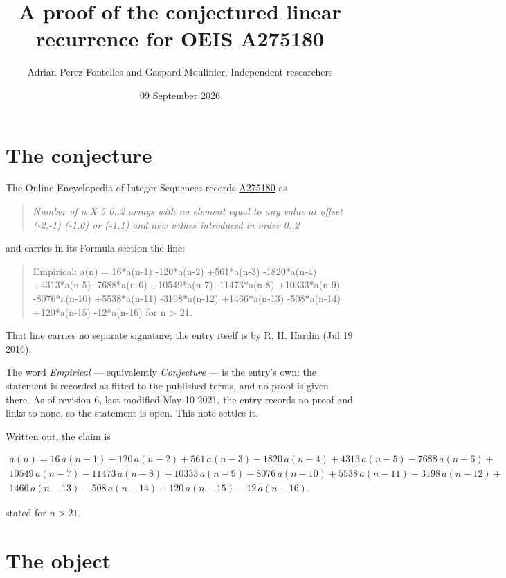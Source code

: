 \documentclass[11pt]{article}
\title{A proof of the conjectured linear recurrence for OEIS A275180}
\author{Adrian Perez Fontelles and Gaspard Moulinier, Independent researchers}
\date{09 September 2026}
\theoremstyle{definition}
\begin{document}
\maketitle
\section{The conjecture}

The Online Encyclopedia of Integer Sequences records \href{https://oeis.org/A275180}{A275180} as

\begin{quote}\itshape Number of n X 5 0..2 arrays with no element equal to any value at offset (-2,-1) (-1,0) or (-1,1) and new values introduced in order 0..2\end{quote}

and carries in its Formula section the line:

\begin{quote}\ttfamily Empirical: a(n) = 16*a(n-1) -120*a(n-2) +561*a(n-3) -1820*a(n-4) +4313*a(n-5) -7688*a(n-6) +10549*a(n-7) -11473*a(n-8) +10333*a(n-9) -8076*a(n-10) +5538*a(n-11) -3198*a(n-12) +1466*a(n-13) -508*a(n-14) +120*a(n-15) -12*a(n-16) for n > 21.\end{quote}

That line carries no separate signature; the entry itself is by R. H. Hardin (Jul 19 2016).

The word {\itshape Empirical} --- equivalently {\itshape Conjecture} --- is the entry's own: the statement is recorded as fitted to the published terms, and no proof is given there. As of revision 6, last modified May 10 2021, the entry records no proof and links to none, so the statement is open. This note settles it.

Written out, the claim is

\begin{multline*} a(n) = 16\,a(n-1) - 120\,a(n-2) + 561\,a(n-3) - 1820\,a(n-4) + 4313\,a(n-5) - 7688\,a(n-6) + \\ 10549\,a(n-7) - 11473\,a(n-8) + 10333\,a(n-9) - 8076\,a(n-10) + 5538\,a(n-11) - 3198\,a(n-12) + \\ 1466\,a(n-13) - 508\,a(n-14) + 120\,a(n-15) - 12\,a(n-16). \end{multline*}

stated for $n > 21$.

\section{The object}
\end{document}
